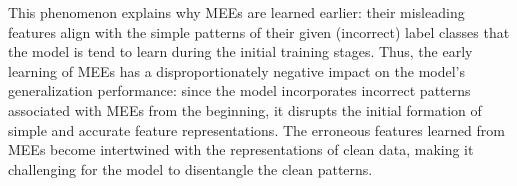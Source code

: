 This phenomenon explains why MEEs are learned earlier: their misleading features align with the simple patterns of their given (incorrect) label classes that the model is tend to learn during the initial training stages. Thus, the early learning of MEEs has a disproportionately negative impact on the model's generalization performance: since the model incorporates incorrect patterns associated with MEEs from the beginning, it disrupts the initial formation of simple and accurate feature representations. The erroneous features learned from MEEs become intertwined with the representations of clean data, making it challenging for the model to disentangle the clean patterns.

